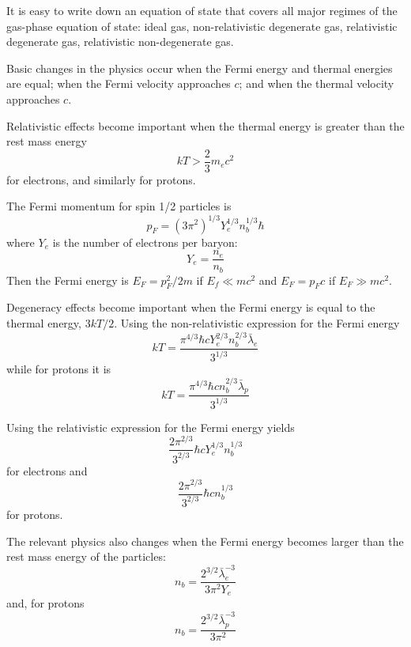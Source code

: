 \documentclass{emulateapj}
\newcommand{\compton}{\bar{\lambda}}
\begin{document}
It is easy to write down an equation of state that covers all major
regimes of the gas-phase equation of state: ideal gas,
non-relativistic degenerate gas, relativistic degenerate gas,
relativistic non-degenerate gas.

Basic changes in the physics occur when the Fermi energy and thermal
energies are equal; when the Fermi velocity approaches $c$; and when
the thermal velocity approaches $c$.  

Relativistic effects become important when the thermal energy is
greater than the rest mass energy
\begin{equation}
k T > \frac{2}{3} m_e c^2
\end{equation}
for electrons, and similarly for protons.

The Fermi momentum for spin 1/2 particles is
\begin{equation}
  p_F = (3 \pi^2)^{1/3} Y_e^{1/3} n_b^{1/3} \hbar
\end{equation}
where $Y_e$ is the number of electrons per baryon:
\begin{equation}
  Y_e = \frac{n_e}{n_b}
\end{equation}
Then the Fermi energy is $E_F = p_F^2/2 m$ if $E_f \ll m c^2$ and $E_F
= p_F c $ if $E_F \gg mc^2$. 

Degeneracy effects become important when the Fermi energy is equal to
the thermal energy, $3 k T / 2$.  Using the non-relativistic
expression for the Fermi energy
\begin{equation}
  k T = \frac{\pi^{4/3} \hbar c Y_e^{2/3} n_b^{2/3} \compton_e}{3^{1/3}}
\end{equation}
while for protons it is 
\begin{equation}
  k T = \frac{\pi^{4/3} \hbar c n_b^{2/3} \compton_p}{3^{1/3}}
\end{equation}

Using the relativistic expression for the Fermi energy yields
\begin{equation}
  \frac{2 \pi^{2/3}}{3^{2/3}} \hbar c Y_e^{1/3} n_b^{1/3}
\end{equation}
for electrons and 
\begin{equation}
  \frac{2 \pi^{2/3}}{3^{2/3}} \hbar c n_b^{1/3}
\end{equation}
for protons.

The relevant physics also changes when the Fermi energy becomes larger
than the rest mass energy of the particles:
\begin{equation}
  n_b = \frac{2^{3/2} \compton_e^{-3}}{3 \pi^2 Y_e}
\end{equation}
and, for protons
\begin{equation}
  n_b = \frac{2^{3/2} \compton_p^{-3}}{3 \pi^2}
\end{equation}
\end{document}
